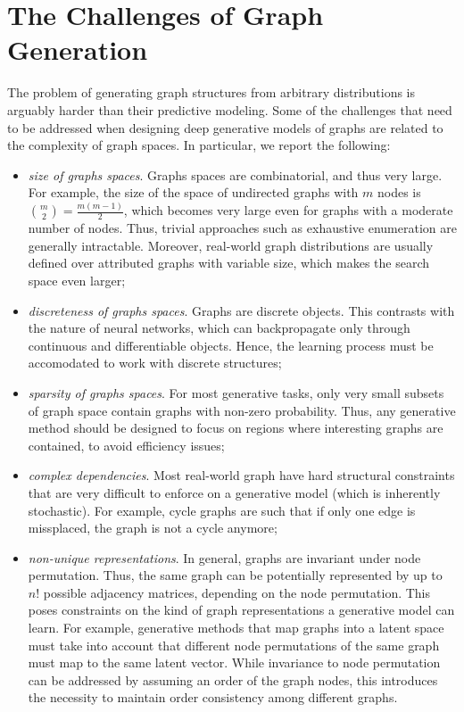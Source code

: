 \section{The Challenges of Graph Generation}
The problem of generating graph structures from arbitrary distributions is arguably harder than their predictive modeling. Some of the challenges that need to be addressed when designing deep generative models of graphs are related to the complexity of graph spaces. In particular, we report the following:
\begin{itemize}
    \item \emph{size of graphs spaces}. Graphs spaces are combinatorial, and thus very large. For example, the size of the space of undirected graphs with $m$ nodes is ${m \choose 2} = \frac{m(m-1)}{2}$, which becomes very large even for graphs with a moderate number of nodes. Thus, trivial approaches such as exhaustive enumeration are generally intractable. Moreover, real-world graph distributions are usually defined over attributed graphs with variable size, which makes the search space even larger;
    \item \emph{discreteness of graphs spaces}. Graphs are discrete objects. This contrasts with the nature of neural networks, which can backpropagate only through continuous and differentiable objects. Hence, the learning process must be accomodated to work with discrete structures;
    \item \emph{sparsity of graphs spaces}. For most generative tasks, only very small subsets of graph space contain graphs with non-zero probability. Thus, any generative method should be designed to focus on regions where interesting graphs are contained, to avoid efficiency issues;
    \item \emph{complex dependencies}. Most real-world graph have hard structural constraints that are very difficult to enforce on a generative model (which is inherently stochastic). For example, cycle graphs are such that if only one edge is missplaced, the graph is not a cycle anymore;
    \item \emph{non-unique representations}. In general, graphs are invariant under node permutation. Thus, the same graph can be potentially represented by up to $n!$ possible adjacency matrices, depending on the node permutation. This poses constraints on the kind of graph representations a generative model can learn. For example, generative methods that map graphs into a latent space must take into account that different node permutations of the same graph must map to the same latent vector. While invariance to node permutation can be addressed by assuming an order of the graph nodes, this introduces the necessity to maintain order consistency among different graphs.
\end{itemize}

